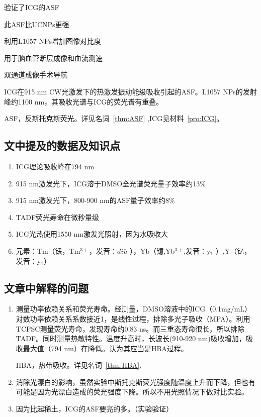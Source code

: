 \documentclass[cn,11pt,chinese]{elegantbook}
\begin{document}
\begin{introduction}[创新点概要]
  \item 验证了ICG的ASF
  \item 此ASF比UCNPs更强
  \item 利用L1057 NPs增加图像对比度
  \item 用于脑血管断层成像和血流测速
  \item 双通道成像手术导航
\end{introduction}

\begin{remark}
  ICG在915 nm CW光激发下的热激发振动能级吸收引起的ASF。L1057 NPs的发射峰约1100 nm，其吸收光谱与ICG的荧光谱有重叠。
\end{remark}

\begin{note}
  ASF，反斯托克斯荧光。详见名词~\vref{thm:ASF} ,ICG见材料~\vref{pro:ICG}。
\end{note}

\subsection{文中提及的数据及知识点}

  \begin{enumerate}
    \item ICG理论吸收峰在794 nm
    \item 915 nm激发光下，ICG溶于DMSO全光谱荧光量子效率约13\%
    \item 915 nm激发光下，800-900 nm的ASF量子效率约8\%
    \item TADF荧光寿命在微秒量级
    \item ICG光热使用1550 nm激发光照射，因为水吸收大
    \item 元素：Tm（铥，Tm$^{3+}$，发音：$di\bar{u}$ ），Yb（镱,Yb$^{3+}$,发音：y$\grave{_1}$ ）,Y（钇，发音：y$\check{_1}$）
  \end{enumerate}
  
\subsection{文章中解释的问题}
 \begin{enumerate}[itemsep=1.5ex]
   \item {}
   测量功率依赖关系和荧光寿命。经测量，DMSO溶液中的ICG（0.1mg/mL）对数功率依赖关系系数接近1，是线性过程，排除多光子吸收（MPA）。利用TCPSC测量荧光寿命，发现寿命约0.83 ns。而三重态寿命很长，所以排除TADF。同时测量热敏特性。温度升高时，长波长(910-920 nm)吸收增加，吸收最大值（794 nm）在降低。认为其应当是HBA过程。
   \begin{note}
     HBA，热带吸收。详见名词~\vref{thm:HBA}.
   \end{note}
   \item {}
   消除光漂白的影响，虽然实验中斯托克斯荧光强度随温度上升而下降，但也有可能是因为光漂白造成的荧光强度下降。所以不用光照情况下做对比实验。
   \item {}
  因为比起稀土，ICG的ASF要亮的多。（实验验证）


 \end{enumerate} 
\end{document}
